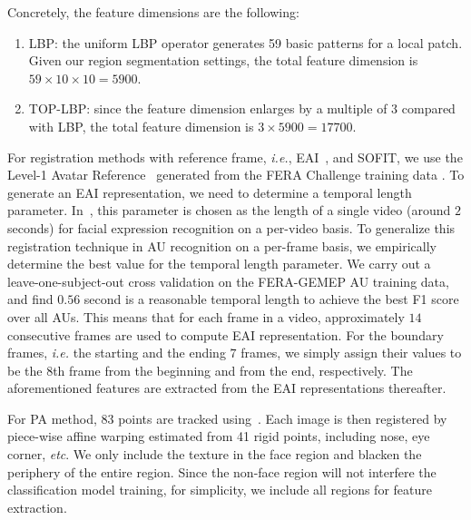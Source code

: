 \documentclass[review]{elsarticle}
\begin{document}
Concretely, the feature dimensions are the following:
\begin{enumerate}
	\item LBP: the uniform LBP operator generates 59 basic patterns for a local patch. Given our region segmentation settings, the total feature dimension is $59\times 10\times 10=5900$. 
	\item TOP-LBP: since the feature dimension enlarges by a multiple of $3$ compared with LBP, the total feature dimension is $3\times 5900=17700$.
\end{enumerate} 



For registration methods with reference frame, \textit{i.e.}, EAI~\cite{Yang_SMCB12}, and SOFIT, we use the Level-1 Avatar Reference~\cite{Yang_SMCB12} generated from the FERA Challenge training data \cite{FERA11}. To generate an EAI representation, we need to determine a temporal length parameter. In~\cite{Yang_SMCB12}, this parameter is chosen as the length of a single video (around $2$ seconds) for facial expression recognition on a per-video basis. To generalize this registration technique in AU recognition on a per-frame basis, we empirically determine the best value for the temporal length parameter. We carry out a leave-one-subject-out cross validation on the FERA-GEMEP AU training data, and find $0.56$ second is a reasonable temporal length to achieve the best F1 score over all AUs. This means that for each frame in a video, approximately $14$ consecutive frames are used to compute EAI representation. For the boundary frames, \textit{i.e.} the starting and the ending $7$ frames, we simply assign their values to be the $8$th frame from the beginning and from the end, respectively. The aforementioned features are extracted from the EAI representations thereafter.

For PA method, 83 points are tracked using~\cite{Tadas_ECCV14}. Each image is then registered by piece-wise affine warping estimated from 41 rigid points, including nose, eye corner, \textit{etc}. We only include the texture in the face region and blacken the periphery of the entire region. Since the non-face region will not interfere the classification model training, for simplicity, we include all regions for feature extraction.  
\end{document}
